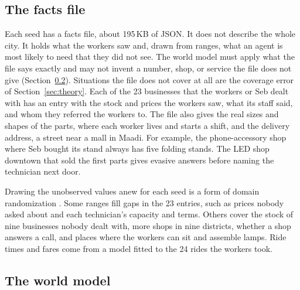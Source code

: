 \documentclass[10pt]{article}
\begin{document}
\subsection{The facts file}

Each seed has a facts file, about 195\,KB of JSON. It does not describe the whole city. It holds what the workers saw and, drawn from ranges, what an agent is most likely to need that they did not see. The world model must apply what the file says exactly and may not invent a number, shop, or service the file does not give (Section~\ref{sec:world}). Situations the file does not cover at all are the coverage error of Section~\ref{sec:theory}. Each of the 23 businesses that the workers or Seb dealt with has an entry with the stock and prices the workers saw, what its staff said, and whom they referred the workers to. The file also gives the real sizes and shapes of the parts, where each worker lives and starts a shift, and the delivery address,
a street near a mall in Maadi. For example, the phone-accessory shop where Seb bought its stand always has five folding stands. The LED shop downtown that sold the first parts gives evasive answers before naming the technician next door.

Drawing the unobserved values anew for each seed is a form of domain randomization \citep{tobin2017domain}. Some ranges fill gaps in the 23 entries, such as prices nobody asked about and each technician's capacity and terms. Others cover the stock of nine businesses nobody dealt with, more shops in
nine districts, whether a shop answers a call, and places where the workers can sit and assemble lamps. Ride times and fares
come from a model fitted to the 24 rides the workers took.

\subsection{The world model}
\label{sec:world}
\end{document}
